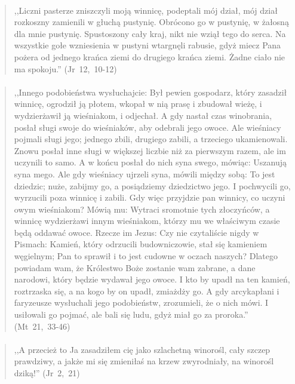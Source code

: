 \documentclass[10pt,a4paper,oneside]{article}
\begin{document}
\paragraph{}
\begin{quote}
,,Liczni pasterze zniszczyli moją winnicę, podeptali mój dział, mój dział rozkoszny zamienili w głuchą pustynię. Obrócono go w pustynię, w żałosną dla mnie pustynię. Spustoszony cały kraj, nikt nie wziął tego do serca. Na wszystkie gołe wzniesienia w pustyni wtargnęli rabusie, gdyż miecz Pana pożera od jednego krańca ziemi do drugiego krańca ziemi. Żadne ciało nie ma spokoju.'' \mbox{(Jr 12, 10-12)}
\end{quote}
\paragraph{}
\begin{quote}
,,Innego podobieństwa wysłuchajcie: Był pewien gospodarz, który zasadził winnicę, ogrodził ją płotem, wkopał w nią prasę i zbudował wieżę, i wydzierżawił ją wieśniakom, i odjechał. A gdy nastał czas winobrania, posłał sługi swoje do wieśniaków, aby odebrali jego owoce. Ale wieśniacy pojmali sługi jego; jednego zbili, drugiego zabili, a trzeciego ukamienowali. Znowu posłał inne sługi w większej liczbie niż za pierwszym razem, ale im uczynili to samo. A w końcu posłał do nich syna swego, mówiąc: Uszanują syna mego. Ale gdy wieśniacy ujrzeli syna, mówili między sobą: To jest dziedzic; nuże, zabijmy go, a posiądziemy dziedzictwo jego. I pochwycili go, wyrzucili poza winnicę i zabili. Gdy więc przyjdzie pan winnicy, co uczyni owym wieśniakom? Mówią mu: Wytraci sromotnie tych złoczyńców, a winnicę wydzierżawi innym wieśniakom, którzy mu we właściwym czasie będą oddawać owoce. Rzecze im Jezus: Czy nie czytaliście nigdy w Pismach: Kamień, który odrzucili budowniczowie, stał się kamieniem węgielnym; Pan to sprawił i to jest cudowne w oczach naszych? Dlatego powiadam wam, że Królestwo Boże zostanie wam zabrane, a dane narodowi, który będzie wydawał jego owoce. I kto by upadł na ten kamień, roztrzaska się, a na kogo by on upadł, zmiażdży go. A gdy arcykapłani i faryzeusze wysłuchali jego podobieństw, zrozumieli, że o nich mówi. I usiłowali go pojmać, ale bali się ludu, gdyż miał go za proroka.'' \mbox{(Mt 21, 33-46)}
\end{quote}
\paragraph{}
\begin{quote}
,,A przecież to Ja zasadziłem cię jako szlachetną winorośl, cały szczep prawdziwy, a jakże mi się zmieniłaś na krzew zwyrodniały, na winorośl dziką!'' \mbox{(Jr 2, 21)}
\end{quote}
\end{document}
